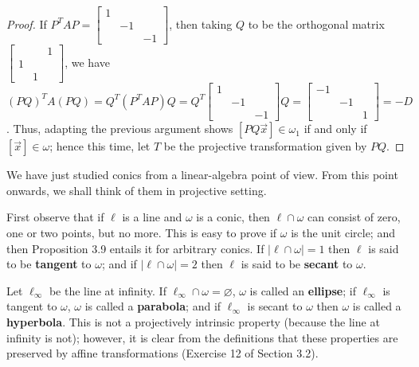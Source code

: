 \documentclass[leqno]{book}
\begin{document}
\begin{proof}
If $P^TAP=\begin{bmatrix}1\\&-1\\&&-1\end{bmatrix}$, then taking $Q$ to be the orthogonal matrix $\begin{bmatrix}&&1\\1\\&1\end{bmatrix}$, we have $(PQ)^TA(PQ)=Q^T(P^TAP)Q=Q^T\begin{bmatrix}1\\&-1\\&&-1\end{bmatrix}Q=\begin{bmatrix}-1\\&-1\\&&1\end{bmatrix}=-D$.  Thus, adapting the previous argument shows $[PQ\vec x]\in\omega_1$ if and only if $[\vec x]\in\omega$; hence this time, let $T$ be the projective transformation given by $PQ$.
\end{proof}

\noindent We have just studied conics from a linear-algebra point of view.  From this point onwards, we shall think of them in projective setting.

First observe that if $\ell$ is a line and $\omega$ is a conic, then $\ell\cap\omega$ can consist of zero, one or two points, but no more.  This is easy to prove if $\omega$ is the unit circle; and then Proposition 3.9 entails it for arbitrary conics.  If $|\ell\cap\omega|=1$ then $\ell$ is said to be \textbf{tangent} to $\omega$; and if $|\ell\cap\omega|=2$ then $\ell$ is said to be \textbf{secant} to $\omega$.

Let $\ell_\infty$ be the line at infinity.  If $\ell_\infty\cap\omega=\varnothing$, $\omega$ is called an \textbf{ellipse}; if $\ell_\infty$ is tangent to $\omega$, $\omega$ is called a \textbf{parabola}; and if $\ell_\infty$ is secant to $\omega$ then $\omega$ is called a \textbf{hyperbola}.  This is not a projectively intrinsic property (because the line at infinity is not); however, it is clear from the definitions that these properties are preserved by affine transformations (Exercise 12 of Section 3.2).
\end{document}
